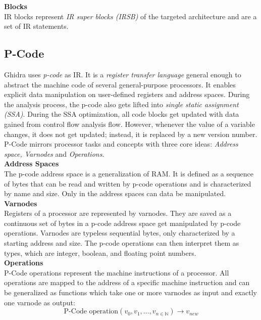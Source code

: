 \documentclass[seminar]{plai}
\begin{document}
\noindent\textbf{Blocks}\\
IR blocks represent \textit{IR super blocks (IRSB)} of the targeted architecture and are a set of IR statements.

\subsection{P-Code}
 Ghidra uses \textit{p-code} as IR. It is a \textit{register transfer language} \cite{PCode-reference-manual} general enough to abstract the machine code of several general-purpose processors. It enables explicit data manipulation on user-defined registers and address spaces. During the analysis process, the p-code also gets lifted into \textit{single static assignment (SSA)}\cite{working-with-ghidras-pCode-to-identify-vulnerable-function-calls}. During the SSA optimization, all code blocks get updated with data gained from control flow analysis flow. However, whenever the value of a variable changes, it does not get updated; instead, it is replaced by a new version number.\cite{introduction-to-compilers-and-language-design}
P-Code mirrors processor tasks and concepts with three core ideas: \textit{Address space, Varnodes} and \textit{Operations}.\\

\noindent\textbf{Address Spaces}\\
The p-code address space is a generalization of RAM.
It is defined as a sequence of bytes that can be read and written by p-code operations and is characterized by name and size. Only in the address spaces can data be manipulated.\\

\noindent\textbf{Varnodes}\\
Registers of a processor are represented by varnodes. They are saved as a continuous set of bytes in a p-code address space get manipulated by p-code operations.
Varnodes are typeless sequential bytes, only characterized by a starting address and size. The p-code operations can then interpret them as types, which are integer, boolean, and floating point numbers.\\

\noindent\textbf{Operations}\\
P-Code operations represent the machine instructions of a processor.
All operations are mapped to the address of a specific machine instruction and can be generalized as functions which take one or more varnodes as input and exactly one varnode as output:\cite{PCode-reference-manual}
$$
\text{P-Code operation}(v_0,v_1,\dots,v_{n\in\mathbb N}) \rightarrow v_{new}
$$
\end{document}
